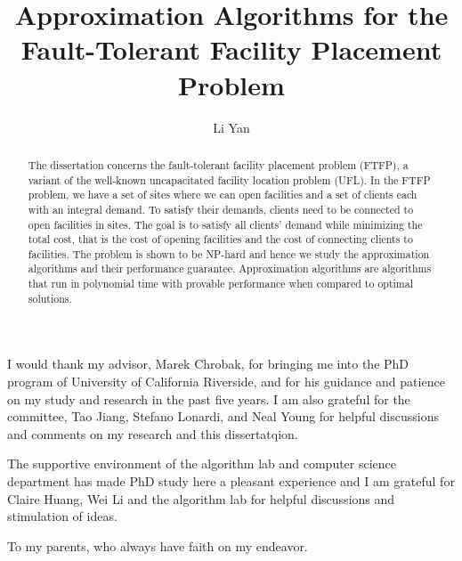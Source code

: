 \documentclass[oneside,final]{ucr}
\begin{document}

\title{Approximation Algorithms for the Fault-Tolerant Facility Placement Problem}
\author{Li Yan}

\maketitle
\copyrightpage{}
\approvalpage{}


\begin{frontmatter}

\begin{acknowledgements}
  I would thank my advisor, Marek Chrobak, for bringing me
  into the PhD program of University of California
  Riverside, and for his guidance and patience on my study
  and research in the past five years. I am also grateful
  for the committee, Tao Jiang, Stefano Lonardi, and Neal
  Young for helpful discussions and comments on my research
  and this dissertatqion.

  The supportive environment of the algorithm lab and
  computer science department has made PhD study here a
  pleasant experience and I am grateful for Claire Huang,
  Wei Li and the algorithm lab for helpful discussions and
  stimulation of ideas.
\end{acknowledgements}

\begin{dedication}
\null\vfil
{\large
\begin{center}
  To my parents, who always have faith on my endeavor.
\end{center}}
\vfil\null
\end{dedication}

\begin{abstract}
  The dissertation concerns the fault-tolerant facility
  placement problem (FTFP), a variant of the well-known
  uncapacitated facility location problem (UFL). In the FTFP
  problem, we have a set of sites where we can open
  facilities and a set of clients each with an integral
  demand. To satisfy their demands, clients need to be
  connected to open facilities in sites. The goal is to
  satisfy all clients' demand while minimizing the total
  cost, that is the cost of opening facilities and the cost
  of connecting clients to facilities. The problem is shown
  to be NP-hard and hence we study the approximation
  algorithms and their performance guarantee. Approximation
  algorithms are algorithms that run in polynomial time with
  provable performance when compared to optimal solutions.


\end{abstract}
\end{frontmatter}
\end{document}
